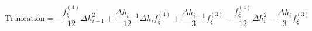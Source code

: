 \begin{equation} 
\text{Truncation} = - \frac{f^{{(4)}}_{{\xi}}}{12} \Delta h_{{i-1}}^{2} + \frac{\Delta h_{{i-1}}}{12} \Delta h_{{i}} f^{{(4)}}_{{\xi}} + \frac{\Delta h_{{i-1}}}{3} f^{{(3)}}_{{\xi}} - \frac{f^{{(4)}}_{{\xi}}}{12} \Delta h_{{i}}^{2} - \frac{\Delta h_{{i}}}{3} f^{{(3)}}_{{\xi}}
 \end{equation}